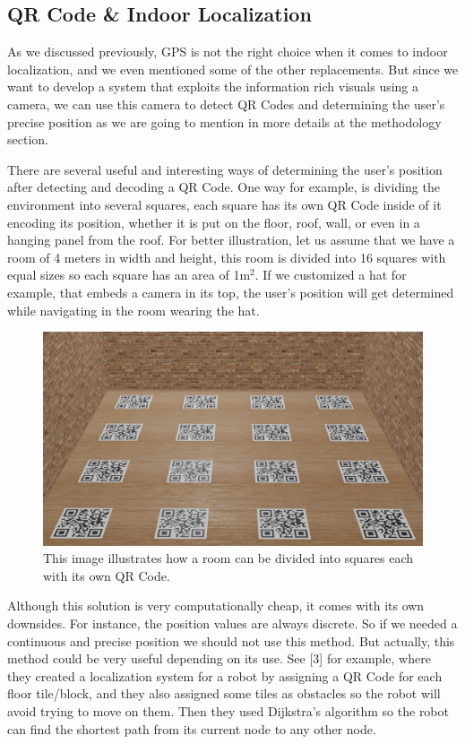 \subsection{QR Code \& Indoor Localization}

As we discussed previously, GPS is not the right choice when it comes to indoor localization, and we even mentioned some of the other replacements. But since we want to develop a system that exploits the information rich visuals using a camera, we can use this camera to detect QR Codes and determining the user's precise position as we are going to mention in more details at the methodology section.

There are several useful and interesting ways of determining the user's position after detecting and decoding a QR Code. One way for example, is dividing the environment into several squares, each square has its own QR Code inside of it encoding its position, whether it is put on the floor, roof, wall, or even in a hanging panel from the roof. For better illustration, let us assume that we have a room of 4 meters in width and height, this room is divided into 16 squares with equal sizes so each square has an area of 1m$^2$. If we customized a hat for example, that embeds a camera in its top, the user's position will get determined while navigating in the room wearing the hat. 

\begin{figure}[h]
	\includegraphics[width=\textwidth]{assets/ch2/Divided room for QR Codes/Divided room for QR Codes.png}
	\caption{ This image illustrates how a room can be divided into squares each with its own QR Code. }
\end{figure}

Although this solution is very computationally cheap, it comes with its own downsides. For instance, the position values are always discrete. So if we needed a continuous and precise position we should not use this method. But actually, this method could be very useful depending on its use. See [3] for example, where they created a localization system for a robot by assigning a QR Code for each floor tile/block, and they also assigned some tiles as obstacles so the robot will avoid trying to move on them. Then they used Dijkstra’s algorithm so the robot can find the shortest path from its current node to any other node.

